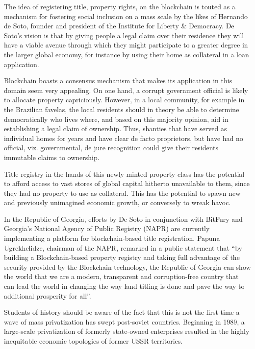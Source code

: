 The idea of registering title, property rights, on the blockchain is touted as a mechanism for fostering social inclusion on a mass scale by the likes of Hernando de Soto, founder and president of the Institute for Liberty & Democracy. De Soto's vision is that by giving people a legal claim over their residence they will have a viable avenue through which they might participate to a greater degree in the larger global economy, for instance by using their home as collateral in a loan application.

Blockchain boasts a consensus mechanism that makes its application in this domain seem very appealing. On one hand, a corrupt government official is likely to allocate property capriciously. However, in a local community, for example in the Brazilian favelas, the local residents should in theory be able to determine democratically who lives where, and based on this majority opinion, aid in establishing a legal claim of ownership. Thus, shanties that have served as individual homes for years and have clear de facto proprietors, but have had no official, viz. governmental, de jure recognition could give their residents immutable claims to ownership.

Title registry in the hands of this newly minted property class has the potential to afford access to vast stores of global capital hitherto unavailable to them, since they had no property to use as collateral. This has the potential to spawn new and previously unimagined economic growth, or conversely to wreak havoc.

In the Republic of Georgia, efforts by De Soto in conjunction with BitFury and Georgia's National Agency of Public Registry (NAPR) are currently implementing a platform for blockchain-based title registration. Papuna Ugrekhelidze, chairman of the NAPR, remarked in a public statement that ``by building a Blockchain-based property registry and taking full advantage of the security provided by the Blockchain technology, the Republic of Georgia can show the world that we are a modern, transparent and corruption-free country that can lead the world in changing the way land titling is done and pave the way to additional prosperity for all''.

Students of history should be aware of the fact that this is not the first time a wave of mass privatization has swept post-soviet countries. Beginning in 1989, a large-scale privatization of formerly state-owned enterprises resulted in the highly inequitable economic topologies of former USSR territories.

